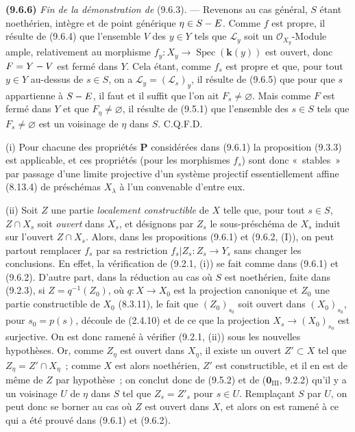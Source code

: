 \label{IV.9.6.6-fr}%
\textbf{(9.6.6)} \emph{Fin de la démonstration de} (9.6.3). --- Revenons au cas
général, $S$ étant noethérien, intègre et de point générique
$\eta\in S- E$. Comme $f$ est propre, il résulte de (9.6.4) que l'ensemble $V$
des $y\in Y$ tels que $\mathcal L_y$ soit un $\mathcal O_{X_y}$-Module ample,
relativement au morphisme $f_y:X_y\to\operatorname{Spec}(\boldsymbol{k}(y))$ est ouvert,
donc $F=Y- V$ est fermé dans $Y$. Cela étant, comme $f_s$ est propre et que,
pour tout $y\in Y$ au-dessus de $s\in S$, on a
$\mathcal L_y=(\mathcal L_s)_y$, il résulte de (9.6.5) que pour que $s$
appartienne à $S- E$, il faut et il suffit que l'on ait $F_s\neq\varnothing$.
Mais comme $F$ est fermé dans $Y$ et que $F_\eta\neq\varnothing$, il résulte
de (9.5.1) que l'ensemble des $s\in S$ tels que $F_s\neq\varnothing$ est un
voisinage de $\eta$ dans $S$. C.Q.F.D.

\begin{remarks}[9.6.7]
\label{IV.9.6.7-fr}
(i) Pour chacune des propriétés $\boldsymbol{P}$ considérées dans (9.6.1) la proposition
(9.3.3) est applicable, et ces propriétés (pour les morphismes $f_s$) sont donc
«~stables~» par passage d'une limite projective d'un système projectif
essentiellement affine (8.13.4) de préschémas $X_\lambda$ à l'un convenable
d'entre eux.

(ii) Soit $Z$ une partie \emph{localement constructible} de $X$ telle que, pour
tout $s\in S$, $Z\cap X_s$ soit \emph{ouvert} dans $X_s$, et désignons par
$Z_s$ le sous-préschéma de $X_s$ induit sur l'ouvert $Z\cap X_s$.
Alors, dans les propositions (9.6.1) et (9.6.2, (I)), on peut partout remplacer
$f_s$ par sa restriction $f_s|Z_s:Z_s\to Y_s$ sans changer les conclusions. En
effet, la vérification de (9.2.1, (i)) se fait comme dans (9.6.1) et (9.6.2).
D'autre part, dans la réduction au cas où $S$ est noethérien, faite dans
(9.2.3), si $Z=q^{-1}(Z_0)$, où $q:X\to X_0$ est la projection canonique et
$Z_0$ une partie constructible de $X_0$ (8.3.11), le fait que
$(Z_0)_{s_0}$ soit ouvert dans $(X_0)_{s_0}$, pour $s_0=p(s)$, découle de
(2.4.10) et de ce que la projection $X_s\to(X_0)_{s_0}$ est surjective. On est
donc ramené à vérifier (9.2.1, (ii)) sous les nouvelles hypothèses. Or, comme
$Z_\eta$ est ouvert dans $X_\eta$, il existe un ouvert $Z'\subset X$ tel que
$Z_\eta=Z'\cap X_\eta$~; comme $X$ est alors noethérien, $Z'$ est
constructible, et il en est de même de $Z$ par hypothèse~; on conclut donc de
(9.5.2) et de ($\mathbf 0_{\mathrm{III}}$, 9.2.2) qu'il y a un voisinage $U$
de $\eta$ dans $S$ tel que $Z_s=Z'_s$ pour $s\in U$. Remplaçant $S$ par $U$,
on peut donc se borner au cas où $Z$ est ouvert dans $X$, et alors on est
ramené à ce qui a été prouvé dans (9.6.1) et (9.6.2).
\end{remarks}

